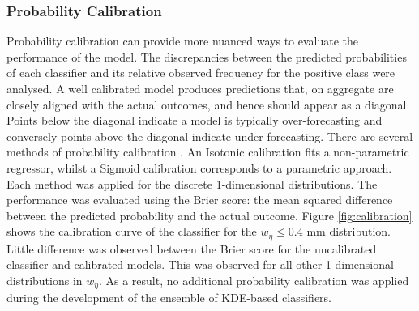 \subsubsection{Probability Calibration}


Probability calibration can provide more nuanced ways to evaluate the performance of the model. The discrepancies between the predicted probabilities of each classifier and its relative observed frequency for the positive class were analysed. A well calibrated model produces predictions that, on aggregate are closely aligned with the actual outcomes, and hence should appear as a diagonal. Points below the diagonal indicate a model is typically over-forecasting and conversely points above the diagonal indicate under-forecasting. There are several methods of probability calibration \cite{prob-calibration}. An Isotonic calibration fits a non-parametric regressor, whilst a Sigmoid calibration corresponds to a parametric approach. Each method was applied for the discrete 1-dimensional distributions. The performance was evaluated using the Brier score: the mean squared difference between the predicted probability and the actual outcome. Figure \ref{fig:calibration} shows the calibration curve of the classifier for the $w_{\eta} \leq 0.4$ mm distribution. Little difference was observed between the Brier score for the uncalibrated classifier and calibrated models. This was observed for all other 1-dimensional distributions in $w_{\eta}$. As a result, no additional probability calibration was applied during the development of the ensemble of KDE-based classifiers.


